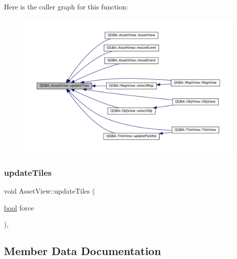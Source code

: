 Here is the caller graph for this function\+:
\nopagebreak
\begin{figure}[H]
\begin{center}
\leavevmode
\includegraphics[width=350pt]{class_q_g_b_a_1_1_asset_view_a193af696b5d01a5a382c0b9410d5b708_icgraph}
\end{center}
\end{figure}
\mbox{\label{class_q_g_b_a_1_1_asset_view_a9ef6a03dbe512bec5dbd2aa5baa57f73}} 
\subsubsection{\texorpdfstring{update\+Tiles}{updateTiles}\hspace{0.1cm}{\footnotesize\ttfamily [2/2]}}
{\footnotesize\ttfamily void Asset\+View\+::update\+Tiles (\begin{DoxyParamCaption}\item[{\mbox{\hyperlink{libretro_8h_a4a26dcae73fb7e1528214a068aca317e}{bool}}}]{force }\end{DoxyParamCaption})\hspace{0.3cm}{\ttfamily [protected]}, {\ttfamily [slot]}}



\subsection{Member Data Documentation}
\mbox{\label{class_q_g_b_a_1_1_asset_view_af4c3bc555866c27babd5d3fd7eed3f45}} 
